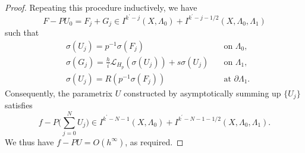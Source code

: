 \documentclass[10pt, a4paper, twoside]{amsart}
\numberwithin{equation}{section}
\theoremstyle{remark}
\begin{document}
\begin{appendix}
\begin{proof}
	Repeating this procedure inductively, we have $$F - PU_0 = F_j + G_j \in I^{k^\prime - j}(X, \Lambda_0) + I^{k^\prime - j - 1/2} (X, \Lambda_0, \Lambda_1)$$ such that \begin{eqnarray*}&\sigma(U_j) = p^{-1} \sigma(F_j) &\quad \mbox{on $\Lambda_0$},\\ &\sigma(G_j) = \frac{h}{i} \mathcal{L}_{H_{p}} (\sigma(U_j)) + s \sigma(U_j) & \quad\mbox{on $\Lambda_1$}, \\ &\sigma(U_j) = R(p^{-1} \sigma(F_j)) &\quad\mbox{at $\partial \Lambda_1$}.
	\end{eqnarray*} Consequently, the parametrix $U$ constructed by asymptotically summing up $\{U_j\}$ satisfies  $$f - P\bigg(\sum_{j = 0}^N U_j\bigg) \in I^{k^\prime - N - 1}(X, \Lambda_0) + I^{k^\prime - N - 1 - 1/2} (X, \Lambda_0, \Lambda_1).$$
	We thus have $f - PU = O(h^\infty)$, as required. 
	\end{proof}
	

\end{appendix}
\end{document}
